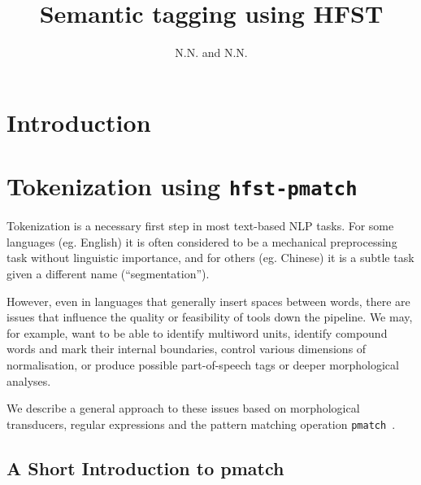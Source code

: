 \documentclass{llncs}
\begin{document}
%
\title{Semantic tagging using HFST}
%
\author{N.N. and N.N.}


\maketitle


\begin{abstract}
\end{abstract}

\section*{Introduction}

\section{Tokenization using {\tt hfst-pmatch}}\label{sec:tokenization}
Tokenization is a necessary first step in most text-based NLP tasks. For some
languages (eg. English) it is often considered to be a mechanical
preprocessing task without linguistic importance, and for others (eg. Chinese)
it is a subtle task given a different name (``segmentation'').

However, even in languages that generally insert spaces between words, there
are issues that influence the quality or feasibility of tools down the
pipeline. We may, for example, want to be able to identify multiword units,
identify compound words and mark their internal boundaries, control various
dimensions of normalisation, or produce possible part-of-speech tags or
deeper morphological analyses.

We describe a general approach to these issues based on morphological
transducers, regular expressions and the pattern matching operation
\verb+pmatch+~\cite{pmatchcite}.

\subsection{A Short Introduction to pmatch}
\end{document}
